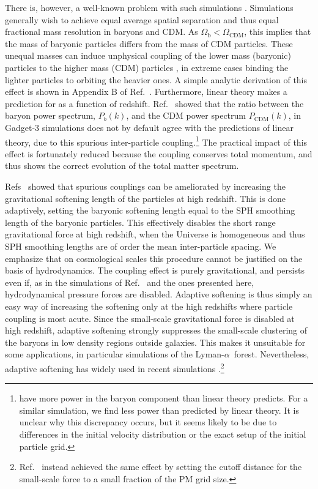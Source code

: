 \documentclass[a4paper,11pt]{article}
\newcommand{\Lya}{Lyman-$\alpha$}
\begin{document}
There is, however, a well-known problem with such simulations \cite{OLeary:2012, Angulo:2013}. Simulations generally wish to achieve equal average spatial separation and thus equal fractional mass resolution in baryons and CDM. As $\Omega_\mathrm{b} < \Omega_\mathrm{CDM}$, this implies that the mass of baryonic particles differs from the mass of CDM particles.
 These unequal masses can induce unphysical coupling of the lower mass (baryonic) particles to the higher mass (CDM) particles \cite{OLeary:2012}, in extreme cases binding the lighter particles to orbiting the heavier ones. A simple analytic derivation of this effect is shown in Appendix B of Ref.~\cite{OLeary:2012}. Furthermore, linear theory makes a prediction for  as a function of redshift. Ref.~\cite{Angulo:2013} showed that the ratio between the baryon power spectrum, $P_b(k)$, and the CDM power spectrum $P_\mathrm{CDM}(k)$, in Gadget-3 \cite{Springel:2005} simulations does not by default agree with the predictions of linear theory, due to this spurious inter-particle coupling.\footnote{\cite{Angulo:2013} have more power in the baryon component than linear theory predicts. For a similar simulation, we find less power than predicted by linear theory. It is unclear why this discrepancy occurs, but it seems likely to be due to differences in the initial velocity distribution or the exact setup of the initial particle grid.} The practical impact of this effect is fortunately reduced because the coupling conserves total momentum, and thus shows the correct evolution of the total matter spectrum.

Refs~\cite{OLeary:2012, Angulo:2013} showed that spurious couplings can be ameliorated by increasing the gravitational softening length of the particles at high redshift. This is done adaptively, setting the baryonic softening length equal to the SPH smoothing length of the baryonic particles. This effectively disables the short range gravitational force at high redshift, when the Universe is homogeneous and thus SPH smoothing lengths are of order the mean inter-particle spacing. We emphasize that on cosmological scales this procedure cannot be justified on the basis of hydrodynamics. The coupling effect is purely gravitational, and persists even if, as in the simulations of Ref.~\cite{Angulo:2013} and the ones presented here, hydrodynamical pressure forces are disabled. Adaptive softening is thus simply an easy way of increasing the softening only at the high redshifts where particle coupling is most acute. Since the small-scale gravitational force is disabled at high redshift, adaptive softening strongly suppresses the small-scale clustering of the baryons in low density regions outside galaxies. This makes it unsuitable for some applications, in particular simulations of the \Lya~forest. Nevertheless, adaptive softening has widely used in recent simulations \cite[e.g][]{Paco:2018}.\footnote{Ref.~\cite{Valkenburg:2017} instead achieved the same effect by setting the cutoff distance for the small-scale force to a small fraction of the PM grid size.}
\end{document}
